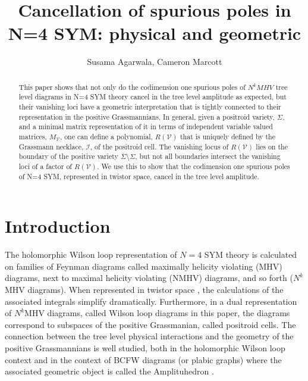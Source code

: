 \documentclass[11pt]{article}
\title{Cancellation of spurious poles in N=4 SYM: physical and geometric}
\author{Susama Agarwala, Cameron Marcott}
\newcommand{\cV}{\mathcal{V}}
\newcommand{\cI}{\mathcal{I}}
\theoremstyle{remark}
\theoremstyle{definition}
\begin{document}
\maketitle
\begin{abstract}
This paper shows that not only do the codimension one spurious poles of $N^k MHV$ tree level diagrams in N=4 SYM theory cancel in the tree level amplitude as expected, but their vanishing loci have a geometric interpretation that is tightly connected to their representation in the positive Grassmannians. In general, given a positroid variety, $\Sigma$, and a minimal matrix representation of it in terms of independent variable valued matrices, $M_\cV$, one can define a polynomial, $R(\cV)$ that is uniquely defined by the Grassmann necklace, $\cI$, of the positroid cell. The vanishing locus of $R(\cV)$ lies on the boundary of the positive variety $\overline{\Sigma} \setminus \Sigma$, but not all boundaries intersect the vanishing loci of a factor of $R(\cV)$. We use this to show that the codimension one spurious poles of  N=4 SYM, represented in twistor space, cancel in the tree level amplitude.
\end{abstract}
\section{Introduction}

The holomorphic Wilson loop representation of $N=4$ SYM theory is calculated on families of Feynman diagrams called maximally helicity violating (MHV) diagrams, next to maximal helicity violating (NMHV) diagrams, and so forth ($N^k$MHV diagrams). When represented in twistor space \cite{Adamo:2011pr,Boels:2007qn, Bullimore:2010pj}, the calculations of the associated integrals simplify dramatically. Furthermore, in a dual representation of $N^k$MHV diagrams, called Wilson loop diagrams in this paper, the diagrams correspond to subspaces of the positive Grassmanian, called positroid cells. The connection between the tree level physical interactions and the geometry of the positive Grassmannians is well studied, both in the holomorphic Wilson loop context and in the context of BCFW diagrams (or plabic graphs) where the associated geometric object is called the Amplituhedron \cite[Chapter 2]{GrassmannAmplitudebook}. 
\end{document}
